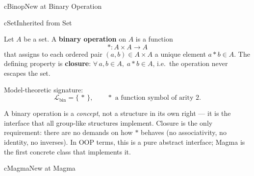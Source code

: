 \begin{bpnew}{cBinop}{New at Binary Operation}
\end{bpnew}

\begin{bpinh}{cSet}{Inherited from Set}
\end{bpinh}

\begin{definition}
\label{def:formal-model-theoretic-structures-l275}
  Let $A$ be a set.  A \textbf{binary operation} on $A$ is a function
  \[
    * : A \times A \to A
  \]
  that assigns to each ordered pair $(a, b) \in A \times A$ a unique element
  $a * b \in A$.  The defining property is \textbf{closure}:
  $\forall\,a, b \in A,\; a * b \in A$, i.e.\ the operation never escapes the
  set.

  \medskip\noindent
  Model-theoretic signature:
  \[
    \mathcal{L}_{\mathrm{bin}} = \{\,*\,\},
    \qquad * \text{ a function symbol of arity } 2.
  \]
\end{definition}

\begin{remark}
  A binary operation is a \emph{concept}, not a structure in its own right ---
  it is the interface that all group-like structures implement.  Closure is the
  only requirement: there are no demands on how $*$ behaves (no associativity,
  no identity, no inverses).  In OOP terms, this is a pure abstract interface;
  Magma is the first concrete class that implements it.
\end{remark}



\clearpage\thispagestyle{plain}

\begin{bpnew}{cMagma}{New at Magma}
\end{bpnew}

